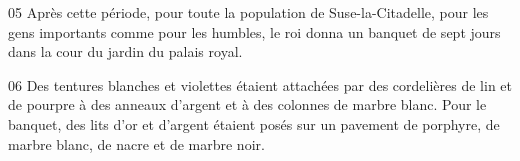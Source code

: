 
05 Après cette période, pour toute la population de Suse-la-Citadelle, pour les gens importants comme pour les humbles, le roi donna un banquet de sept jours dans la cour du jardin du palais royal.

06 Des tentures blanches et violettes étaient attachées par des cordelières de lin et de pourpre à des anneaux d’argent et à des colonnes de marbre blanc. Pour le banquet, des lits d’or et d’argent étaient posés sur un pavement de porphyre, de marbre blanc, de nacre et de marbre noir.
